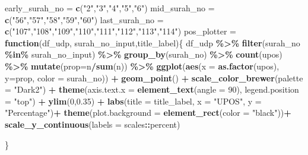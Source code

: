 \documentclass[
]{article}
\newenvironment{Shaded}{\begin{snugshade}}{\end{snugshade}}
\newcommand{\AttributeTok}[1]{\textcolor[rgb]{0.13,0.29,0.53}{#1}}
\newcommand{\ControlFlowTok}[1]{\textcolor[rgb]{0.13,0.29,0.53}{\textbf{#1}}}
\newcommand{\DecValTok}[1]{\textcolor[rgb]{0.00,0.00,0.81}{#1}}
\newcommand{\FloatTok}[1]{\textcolor[rgb]{0.00,0.00,0.81}{#1}}
\newcommand{\FunctionTok}[1]{\textcolor[rgb]{0.13,0.29,0.53}{\textbf{#1}}}
\newcommand{\NormalTok}[1]{#1}
\newcommand{\OtherTok}[1]{\textcolor[rgb]{0.56,0.35,0.01}{#1}}
\newcommand{\SpecialCharTok}[1]{\textcolor[rgb]{0.81,0.36,0.00}{\textbf{#1}}}
\newcommand{\StringTok}[1]{\textcolor[rgb]{0.31,0.60,0.02}{#1}}
\begin{document}
\begin{Shaded}
\begin{Highlighting}[]
\NormalTok{early\_surah\_no }\OtherTok{=} \FunctionTok{c}\NormalTok{(}\StringTok{"2"}\NormalTok{,}\StringTok{"3"}\NormalTok{,}\StringTok{"4"}\NormalTok{,}\StringTok{"5"}\NormalTok{,}\StringTok{"6"}\NormalTok{)}
\NormalTok{mid\_surah\_no }\OtherTok{=} \FunctionTok{c}\NormalTok{(}\StringTok{"56"}\NormalTok{,}\StringTok{"57"}\NormalTok{,}\StringTok{"58"}\NormalTok{,}\StringTok{"59"}\NormalTok{,}\StringTok{"60"}\NormalTok{)}
\NormalTok{last\_surah\_no }\OtherTok{=} \FunctionTok{c}\NormalTok{(}\StringTok{"107"}\NormalTok{,}\StringTok{"108"}\NormalTok{,}\StringTok{"109"}\NormalTok{,}\StringTok{"110"}\NormalTok{,}\StringTok{"111"}\NormalTok{,}\StringTok{"112"}\NormalTok{,}\StringTok{"113"}\NormalTok{,}\StringTok{"114"}\NormalTok{)}
\NormalTok{pos\_plotter }\OtherTok{=} \ControlFlowTok{function}\NormalTok{(df\_udp, surah\_no\_input,title\_label)\{}
\NormalTok{  df\_udp }\SpecialCharTok{\%\textgreater{}\%} \FunctionTok{filter}\NormalTok{(surah\_no }\SpecialCharTok{\%in\%}\NormalTok{ surah\_no\_input) }\SpecialCharTok{\%\textgreater{}\%} 
                \FunctionTok{group\_by}\NormalTok{(surah\_no) }\SpecialCharTok{\%\textgreater{}\%} \FunctionTok{count}\NormalTok{(upos) }\SpecialCharTok{\%\textgreater{}\%} 
                \FunctionTok{mutate}\NormalTok{(}\AttributeTok{prop=}\NormalTok{n}\SpecialCharTok{/}\FunctionTok{sum}\NormalTok{(n)) }\SpecialCharTok{\%\textgreater{}\%} 
                \FunctionTok{ggplot}\NormalTok{(}\FunctionTok{aes}\NormalTok{(}\AttributeTok{x =} \FunctionTok{as.factor}\NormalTok{(upos), }\AttributeTok{y=}\NormalTok{prop, }\AttributeTok{color =}\NormalTok{ surah\_no)) }\SpecialCharTok{+}
                  \FunctionTok{geom\_point}\NormalTok{() }\SpecialCharTok{+} \FunctionTok{scale\_color\_brewer}\NormalTok{(}\AttributeTok{palette =} \StringTok{"Dark2"}\NormalTok{) }\SpecialCharTok{+}
                  \FunctionTok{theme}\NormalTok{(}\AttributeTok{axis.text.x =} \FunctionTok{element\_text}\NormalTok{(}\AttributeTok{angle =} \DecValTok{90}\NormalTok{), }
                        \AttributeTok{legend.position =} \StringTok{"top"}\NormalTok{) }\SpecialCharTok{+}
                  \FunctionTok{ylim}\NormalTok{(}\DecValTok{0}\NormalTok{,}\FloatTok{0.35}\NormalTok{) }\SpecialCharTok{+}
                  \FunctionTok{labs}\NormalTok{(}\AttributeTok{title =}\NormalTok{ title\_label,}
                     \AttributeTok{x =} \StringTok{"UPOS"}\NormalTok{, }\AttributeTok{y =} \StringTok{"Percentage"}\NormalTok{)}\SpecialCharTok{+}
    \FunctionTok{theme}\NormalTok{(}\AttributeTok{plot.background =} \FunctionTok{element\_rect}\NormalTok{(}\AttributeTok{color =} \StringTok{"black"}\NormalTok{))}\SpecialCharTok{+}
    \FunctionTok{scale\_y\_continuous}\NormalTok{(}\AttributeTok{labels =}\NormalTok{ scales}\SpecialCharTok{::}\NormalTok{percent)}
    
\NormalTok{\}}
\end{Highlighting}
\end{Shaded}
\end{document}
